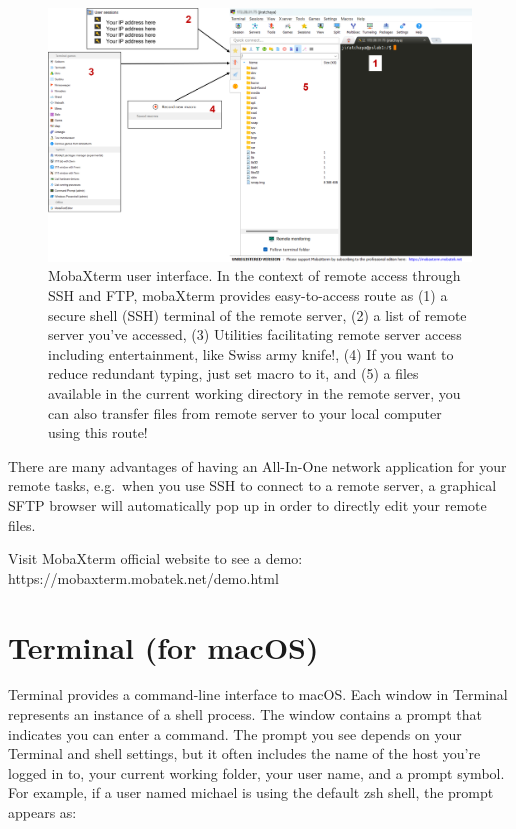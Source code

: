 \documentclass[
  letterpaper,
  DIV=11,
  numbers=noendperiod]{scrreprt}
\begin{document}
\begin{figure}

{\centering \includegraphics{./assets/01_moba_ui.png}

}

\caption{MobaXterm user interface. In the context of remote access
through SSH and FTP, mobaXterm provides easy-to-access route as (1) a
secure shell (SSH) terminal of the remote server, (2) a list of remote
server you've accessed, (3) Utilities facilitating remote server access
including entertainment, like Swiss army knife!, (4) If you want to
reduce redundant typing, just set macro to it, and (5) a files available
in the current working directory in the remote server, you can also
transfer files from remote server to your local computer using this
route!}

\end{figure}

There are many advantages of having an All-In-One network application
for your remote tasks, e.g.~when you use SSH to connect to a remote
server, a graphical SFTP browser will automatically pop up in order to
directly edit your remote files.

Visit MobaXterm official website to see a demo:
https://mobaxterm.mobatek.net/demo.html

\hypertarget{terminal-for-macos}{%
\section{Terminal (for macOS)}\label{terminal-for-macos}}

Terminal provides a command-line interface to macOS. Each window in
Terminal represents an instance of a shell process. The window contains
a prompt that indicates you can enter a command. The prompt you see
depends on your Terminal and shell settings, but it often includes the
name of the host you're logged in to, your current working folder, your
user name, and a prompt symbol. For example, if a user named michael is
using the default zsh shell, the prompt appears as:
\end{document}
